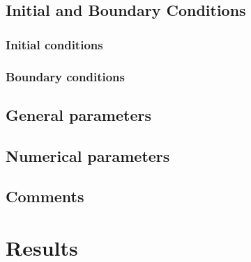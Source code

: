 %
%
%
%
%
%
\subsection{Initial and Boundary Conditions}
%
\subsubsection{Initial conditions}
%

%
\subsubsection{Boundary conditions}
%

%
\subsection{General parameters}
%

%
%
%
\subsection{Numerical parameters}
%

%
\subsection{Comments}
%
%
%
\section{Results}
%

